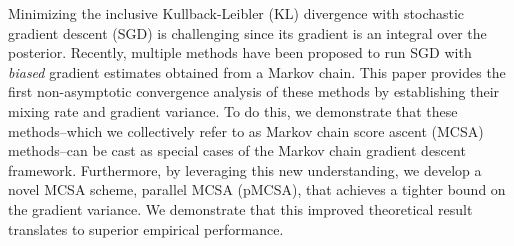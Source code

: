 
Minimizing the inclusive Kullback-Leibler (KL) divergence with stochastic gradient descent (SGD) is challenging since its gradient is an integral over the posterior.
Recently, multiple methods have been proposed to run SGD with \textit{biased} gradient estimates obtained from a Markov chain.
This paper provides the first non-asymptotic convergence analysis of these methods by establishing their mixing rate and gradient variance.
To do this, we demonstrate that these methods--which we collectively refer to as Markov chain score ascent (MCSA) methods--can be cast as special cases of the Markov chain gradient descent framework.
Furthermore, by leveraging this new understanding, we develop a novel MCSA scheme, parallel MCSA (pMCSA), that achieves a tighter bound on the gradient variance.
We demonstrate that this improved theoretical result translates to superior empirical performance.



